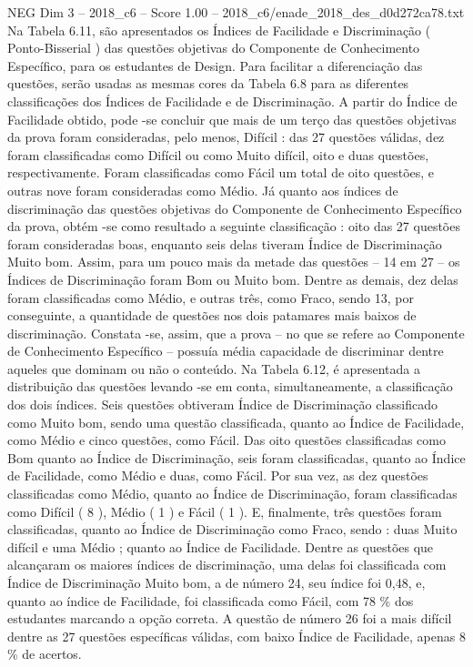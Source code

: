 \begin{textsample}{NEG Dim 3 – 2018\_c6 – Score 1.00 – 2018\_c6/enade\_2018\_des\_d0d272ca78.txt}
Na Tabela 6.11, são apresentados os Índices de Facilidade e Discriminação ( Ponto-Bisserial ) das questões objetivas do Componente de Conhecimento Específico, para os estudantes de Design.
Para facilitar a diferenciação das questões, serão usadas as mesmas cores da Tabela 6.8 para as diferentes classificações dos Índices de Facilidade e de Discriminação.
A partir do Índice de Facilidade obtido, pode -se concluir que mais de um terço das questões objetivas da prova foram consideradas, pelo menos, Difícil : das 27 questões válidas, dez foram classificadas como Difícil ou como Muito difícil, oito e duas questões, respectivamente.
Foram classificadas como Fácil um total de oito questões, e outras nove foram consideradas como Médio.
Já quanto aos índices de discriminação das questões objetivas do Componente de Conhecimento Específico da prova, obtém -se como resultado a seguinte classificação : oito das 27 questões foram consideradas boas, enquanto seis delas tiveram Índice de Discriminação Muito bom.
Assim, para um pouco mais da metade das questões – 14 em 27 – os Índices de Discriminação foram Bom ou Muito bom.
Dentre as demais, dez delas foram classificadas como Médio, e outras três, como Fraco, sendo 13, por conseguinte, a quantidade de questões nos dois patamares mais baixos de discriminação.
Constata -se, assim, que a prova – no que se refere ao Componente de Conhecimento Específico – possuía média capacidade de discriminar dentre aqueles que dominam ou não o conteúdo.
Na Tabela 6.12, é apresentada a distribuição das questões levando -se em conta, simultaneamente, a classificação dos dois índices.
Seis questões obtiveram Índice de Discriminação classificado como Muito bom, sendo uma questão classificada, quanto ao Índice de Facilidade, como Médio e cinco questões, como Fácil.
Das oito questões classificadas como Bom quanto ao Índice de Discriminação, seis foram classificadas, quanto ao Índice de Facilidade, como Médio e duas, como Fácil.
Por sua vez, as dez questões classificadas como Médio, quanto ao Índice de Discriminação, foram classificadas como Difícil ( 8 ), Médio ( 1 ) e Fácil ( 1 ).
E, finalmente, três questões foram classificadas, quanto ao Índice de Discriminação como Fraco, sendo : duas Muito difícil e uma Médio ; quanto ao Índice de Facilidade.
Dentre as questões que alcançaram os maiores índices de discriminação, uma delas foi classificada com Índice de Discriminação Muito bom, a de número 24, seu índice foi 0,48, e, quanto ao índice de Facilidade, foi classificada como Fácil, com 78 \% dos estudantes marcando a opção correta.
A questão de número 26 foi a mais difícil dentre as 27 questões específicas válidas, com baixo Índice de Facilidade, apenas 8 \% de acertos.

\end{textsample}
